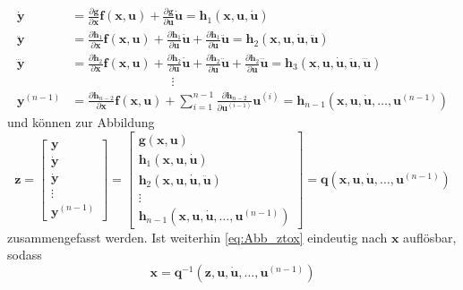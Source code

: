 \begin{align*}
\pmb{\dot{y}} &= \frac{\partial \pmb{g}}{\partial \pmb{x}}\pmb{f}(\pmb{x},\pmb{u}) + \frac{\partial \pmb{g}}{\partial \pmb{u}}\pmb{\dot{u}} = \pmb{h}_1(\pmb{x},\pmb{u},\pmb{\dot{u}})\\
\pmb{\ddot{y}} &= \frac{\partial  \pmb{h}_1}{\partial \pmb{x}}\pmb{f}(\pmb{x},\pmb{u}) + \frac{\partial \pmb{h}_1}{\partial \pmb{u}}\pmb{\dot{u}} + \frac{\partial \pmb{h}_1}{\partial \pmb{\dot{u}}}\pmb{\ddot{u}} = \pmb{h}_2(\pmb{x},\pmb{u},\pmb{\dot{u}},\pmb{\ddot{u}})\\
\pmb{\dddot{y}} &= \frac{\partial  \pmb{h}_2}{\partial \pmb{x}}\pmb{f}(\pmb{x},\pmb{u}) + \frac{\partial \pmb{h}_2}{\partial \pmb{u}}\pmb{\dot{u}} + \frac{\partial \pmb{h}_2}{\partial \pmb{\dot{u}}}\pmb{\ddot{u}} + \frac{\partial \pmb{h}_2}{\partial \pmb{\ddot{u}}}\pmb{\dddot{u}} = \pmb{h}_3(\pmb{x},\pmb{u},\pmb{\dot{u}},\pmb{\ddot{u}},\pmb{\dddot{u}})\\
& \qquad \qquad \qquad \qquad \vdots \\
\pmb{y}^{(n-1)} &= \frac{\partial \pmb{h}_{n-2}}{\partial \pmb{x}}\pmb{f}(\pmb{x},\pmb{u}) + \sum^{n-1}_{i=1}\frac{\partial \pmb{h}_{n-2}}{\partial \pmb{u}^{(i-1)}}\pmb{u}^{(i)} = \pmb{h}_{n-1}(\pmb{x},\pmb{u},\pmb{\dot{u}},\dots,\pmb{u}^{(n-1)})
\end{align*}
und können zur Abbildung
\begin{equation}\label{eq:Abb_ztox}
\pmb{z} = \begin{bmatrix}\pmb{y} \\ \pmb{\dot{y}} \\ \pmb{\dot{y}} \\ \vdots \\ \pmb{y}^{(n-1)} \end{bmatrix} = \begin{bmatrix} \pmb{g}(\pmb{x},\pmb{u}) \\ \pmb{h}_1(\pmb{x},\pmb{u},\pmb{\dot{u}})\\\pmb{h}_2(\pmb{x},\pmb{u},\pmb{\dot{u}},\pmb{\ddot{u}})\\ \vdots \\ \pmb{h}_{n-1}(\pmb{x},\pmb{u},\pmb{\dot{u}},\dots,\pmb{u}^{(n-1)}) \end{bmatrix} = \pmb{q}(\pmb{x},\pmb{u},\pmb{\dot{u}},\dots,\pmb{u}^{(n-1)})
\end{equation}
zusammengefasst werden. Ist weiterhin \eqref{eq:Abb_ztox} eindeutig nach $\pmb{x}$ auflösbar, sodass
\begin{equation}\label{eq:Abb_ztox_inv}
\pmb{x} = \pmb{q}^{-1}(\pmb{z},\pmb{u},\pmb{\dot{u}},\dots,\pmb{u}^{(n-1)})
\end{equation}
